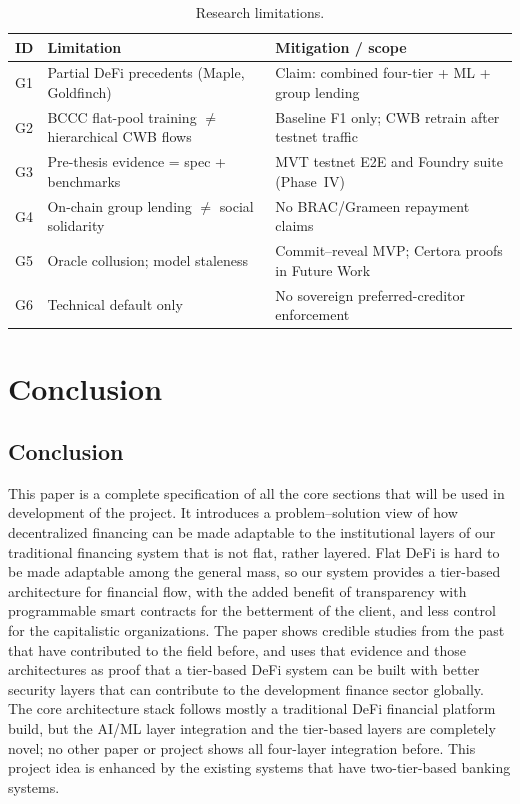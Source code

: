 \documentclass[12pt,a4paper]{report}
\newcommand{\tableheadcolor}{\rowcolor{TableHeadBg}}
\begin{document}
\begin{table}[H]
\centering
\caption[Research limitations]{Research limitations.}
\label{tab:research-limitations}
\small
\begin{tabular}{@{}p{1.0cm}p{3.2cm}p{8.0cm}@{}}
\toprule
\tableheadcolor
\textbf{ID} & \textbf{Limitation} & \textbf{Mitigation / scope} \\
\midrule
G1 & Partial DeFi precedents (Maple, Goldfinch) & Claim: combined four-tier + ML + group lending \\
G2 & BCCC flat-pool training $\neq$ hierarchical CWB flows & Baseline F1 only; CWB retrain after testnet traffic \\
G3 & Pre-thesis evidence = spec + benchmarks & MVT testnet E2E and Foundry suite (Phase~IV) \\
G4 & On-chain group lending $\neq$ social solidarity & No BRAC/Grameen repayment claims \\
G5 & Oracle collusion; model staleness & Commit--reveal MVP; Certora proofs in Future Work \\
G6 & Technical default only & No sovereign preferred-creditor enforcement \\
\bottomrule
\end{tabular}
\end{table}



\chapter{Conclusion}
\label{ch:conclusion}

\section{Conclusion}
\label{sec:conclusion-summary}
\label{sec:research-contribution}

This paper is a complete specification of all the core sections that will be used in development of the project. It introduces a problem--solution view of how decentralized financing can be made adaptable to the institutional layers of our traditional financing system that is not flat, rather layered. Flat DeFi is hard to be made adaptable among the general mass, so our system provides a tier-based architecture for financial flow, with the added benefit of transparency with programmable smart contracts for the betterment of the client, and less control for the capitalistic organizations. The paper shows credible studies from the past that have contributed to the field before, and uses that evidence and those architectures as proof that a tier-based DeFi system can be built with better security layers that can contribute to the development finance sector globally. The core architecture stack follows mostly a traditional DeFi financial platform build, but the AI/ML layer integration and the tier-based layers are completely novel; no other paper or project shows all four-layer integration before. This project idea is enhanced by the existing systems that have two-tier-based banking systems.
\end{document}
